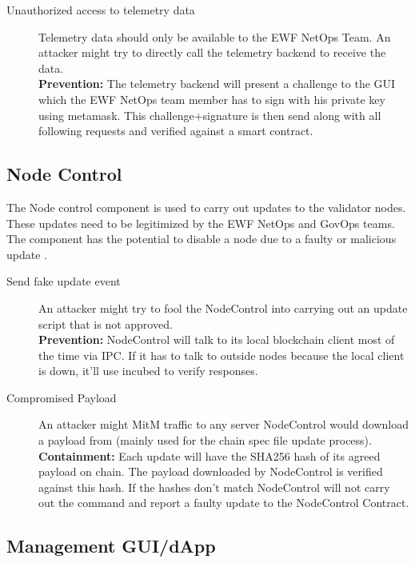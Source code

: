 \begin{description}
    \item[Unauthorized access to telemetry data]
        Telemetry data should only be available to the EWF NetOps Team. An attacker might try to directly call the telemetry backend to receive the data. \\
        \textbf{Prevention:} The telemetry backend will present a challenge to the GUI which the EWF NetOps team member has to sign with his private key using metamask. This challenge+signature is then send along with all following requests and verified against a smart contract.

\end{description}

\subsection{Node Control}

The Node control component is used to carry out updates to the validator nodes. These updates need to be legitimized by the EWF NetOps and GovOps teams.
The component has the potential to disable a node due to a faulty or malicious update .

\begin{description}
    \item[Send fake update event] 
        An attacker might try to fool the NodeControl into carrying out an update script that is not approved. \\
        \textbf{Prevention:} NodeControl will talk to its local blockchain client most of the time via IPC. 
        If it has to talk to outside nodes because the local client is down, it'll use incubed to verify responses.

    \item[Compromised Payload]
        An attacker might MitM traffic to any server NodeControl would download a payload from (mainly used for the chain spec file update process). \\
        \textbf{Containment:} Each update will have the SHA256 hash of its agreed payload on chain. The payload downloaded by NodeControl is verified against this hash. If the hashes don't match NodeControl will not carry out the command and report a faulty update to the NodeControl Contract.

\end{description}


\subsection{Management GUI/dApp}

